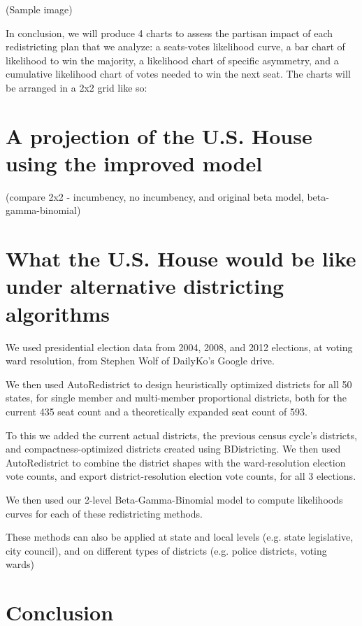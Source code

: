 \documentclass[preprint,12pt]{article}
\begin{document}
(Sample image)

In conclusion, we will produce 4 charts to assess the partisan impact of each redistricting plan that we analyze: a seats-votes likelihood curve, a bar chart of likelihood to win the majority, a likelihood chart of specific asymmetry, and a cumulative likelihood chart of votes needed to win the next seat.  The charts will be arranged in a 2x2 grid like so:


\section{A projection of the U.S. House using the improved model}
(compare 2x2 - incumbency, no incumbency, and original beta model, beta-gamma-binomial)

\section{What the U.S. House would be like under alternative districting algorithms}

We used presidential election data from 2004, 2008, and 2012 elections, at voting ward resolution, from Stephen Wolf of DailyKo's Google drive.

We then used AutoRedistrict to design heuristically optimized districts for all 50 states, for single member and multi-member proportional districts, both for the current 435 seat count and a theoretically expanded seat count of 593.

To this we added the current actual districts, the previous census cycle's districts, and compactness-optimized districts created using BDistricting.   We then used AutoRedistrict to combine the district shapes with the ward-resolution election vote counts, and export district-resolution election vote counts, for all 3 elections.

We then used our 2-level Beta-Gamma-Binomial model to compute likelihoods curves for each of these redistricting methods. 

These methods can also be applied at state and local levels (e.g. state legislative, city council), and on different types of districts (e.g. police districts, voting wards)

\section{Conclusion}

\clearpage
\end{document}
